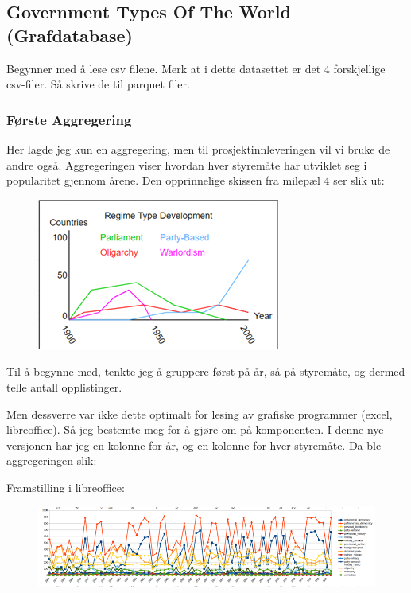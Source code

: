 \subsection{Government Types Of The World (Grafdatabase)}

Begynner med å lese csv filene. Merk at i dette datasettet er det 4 forskjellige csv-filer. Så skrive de til parquet filer.


\subsubsection{Første Aggregering}
Her lagde jeg kun en aggregering, men til prosjektinnleveringen vil vi bruke de andre også. Aggregeringen viser hvordan hver styremåte har utviklet seg i popularitet gjennom årene. Den opprinnelige skissen fra milepæl 4 ser slik ut:

\FigureCounter
\begin{figure}[H]
    \includegraphics[scale=1.0]{images/milepael5/regimeTypeGraphic.png}
\end{figure}

Til å begynne med, tenkte jeg å gruppere først på år, så på styremåte, og dermed telle antall opplistinger.


Men dessverre var ikke dette optimalt for lesing av grafiske programmer (excel, libreoffice). Så jeg bestemte meg for å gjøre om på komponenten. I denne nye versjonen har jeg en kolonne for år, og en kolonne for hver styremåte. Da ble aggregeringen slik:


Framstilling i libreoffice:

\FigureCounter
\begin{figure}[H]
    \includegraphics[width=\textwidth]{images/milepael5/libreOfficeGovPop.png}
\end{figure}